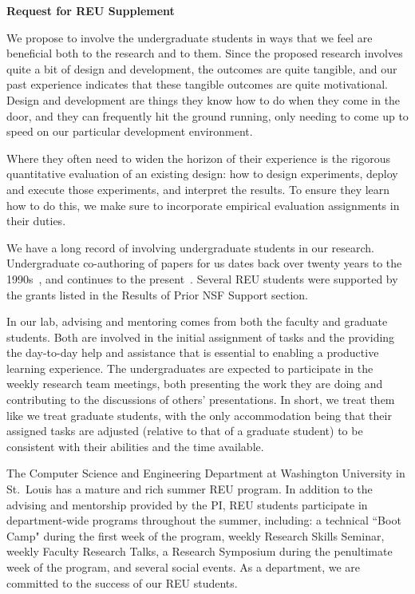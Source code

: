 \documentclass[11pt]{article}
\begin{document}
\pagestyle{empty}
\thispagestyle{empty}

\begin{center}
\textbf{\Large Request for REU Supplement}
\end{center}

We propose to involve the undergraduate students in ways that we feel
are beneficial both to the research and to them.  Since the proposed
research involves quite a bit of design and development, the outcomes
are quite tangible, and our past experience indicates that these
tangible outcomes are quite motivational.  Design and development
are things they know how to do when they come in the door, and they
can frequently hit the ground running, only needing to come up to speed
on our particular development environment.

Where they often need to widen the horizon of their experience is the
rigorous quantitative evaluation of an existing design:
how to design experiments, deploy and execute those experiments,
and interpret the results.
To ensure they learn how to do this, we make sure
to incorporate empirical evaluation assignments in their duties.

We have a long record of involving undergraduate students in our research.
Undergraduate co-authoring of papers for us dates back 
over twenty years to the 1990s~\cite{ch94}, and continues to the
present~\cite{dibs,fcbmc19}.
Several REU students were supported by the grants
listed in the Results of Prior NSF Support section.

In our lab, advising and mentoring comes from both the faculty and graduate
students. Both are involved in the initial assignment of tasks and
the providing the day-to-day help and assistance that is essential to
enabling a productive learning experience.  The undergraduates are
expected to participate in the weekly research team meetings, both
presenting the work they are doing and contributing to the discussions
of others' presentations.  In short, we treat them like we treat graduate
students, with the only accommodation being that their assigned tasks
are adjusted (relative to that of a graduate student) to be consistent
with their abilities and the time available.

The Computer Science and Engineering Department at Washington University
in St.~Louis has a mature and rich summer REU program. In addition to
the advising and mentorship provided by the PI, REU students participate
in department-wide programs throughout the summer, including:
a technical ``Boot Camp" during the first week of the program,
weekly Research Skills Seminar, weekly Faculty Research Talks,
a Research Symposium during the penultimate week of the program,
and several social events.
As a department, we are committed to the success of our REU students.
\end{document}
